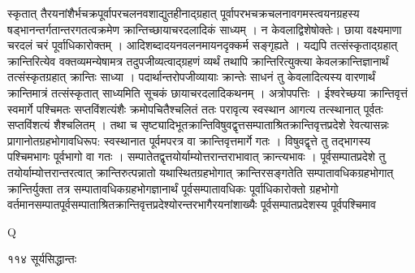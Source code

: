 \documentclass[11pt, openany]{book}
\begin{document}
\begin{sloppypar}
\noindent स्कृतात् तैरयनांशैर्भचक्रपूर्वापरचलनवशाद्युतहीनाद्ग्रहात् पूर्वापरभचक्रचलनावगमस्त्वयनग्रहस्य षड्भानन्तर्गतान्तरगतत्वक्रमेण क्रान्तिच्छायाचरदलादिकं साध्यम् । न केवलाद्विशेषोक्तेः। छाया वक्ष्यमाणा चरदलं चरं पूर्वाधिकारोक्तम् । आदिशब्दादयनवलनमायनदृक्कर्म सङ्गृह्यते । यद्यपि तत्संस्कृताद्ग्रहात् क्रान्तिरित्येव वक्तव्यमन्येषामत्र तदुपजीव्यत्वाद्ग्रहणं व्यर्थं तथापि क्रान्तिरित्युक्त्या केवलक्रान्तिज्ञानार्थं तत्संस्कृतग्रहात् क्रान्तिः साध्या । पदार्थान्तरोपजीव्यायाः क्रान्तेः साधनं तु केवलादित्यस्य वारणार्थं क्रान्तिमात्रं तत्संस्कृतात् साध्यमिति सूचकं छायाचरदलादिकथनम् । अत्रोपपत्तिः । ईश्वरेच्छया क्रान्तिवृत्तं स्वमार्गे पश्चिमतः सप्तविंशत्यंशैः क्रमोपचितैश्चलितं ततः परावृत्य स्वस्थान आगत्य तत्स्थानात् पूर्वतः सप्तविंशत्यं शैश्चलितम् । तथा च सृष्ट्यादिभूतक्रान्तिविषुवद्वृत्तसम्पाताश्रितक्रान्तिवृत्तप्रदेशे रेवत्यासन्नः प्रागानोतग्रहभोगावधिरूप: स्वस्थानात पूर्वमपरत्र वा क्रान्तिवृत्तमार्गे गतः । विषुवद्वृत्ते तु तद्भागस्य पश्चिमभागः पूर्वभागो वा गतः । सम्पातेतद्वृत्तयोर्याम्योत्तरान्तराभावात् क्रान्त्यभावः । पूर्वसम्पातप्रदेशे तु तयोर्याम्योत्तरान्तरत्वात् क्रान्तिरुत्पन्नातो यथास्थितग्रहभोगात् क्रान्तिरसङ्गतेति सम्पातावधिकग्रहभोगात् क्रान्तिर्युक्ता तत्र सम्पातावधिकग्रहभोगज्ञानार्थं पूर्वसम्पातावधिकः पूर्वाधिकारोक्तो ग्रहभोगो वर्तमानसम्पातपूर्वसम्पाताश्रितक्रान्तिवृत्तप्रदेश्योरन्तरभागैरयनांशाख्यैः पूर्वसम्पातप्रदेशस्य पूर्वपश्चिमाव\textendash
\end{sloppypar}
{\tiny{Q}}

\newpage


\noindent ११४ \hspace{4cm} सूर्यसिद्धान्तः
\vspace{1cm}
\end{document}
